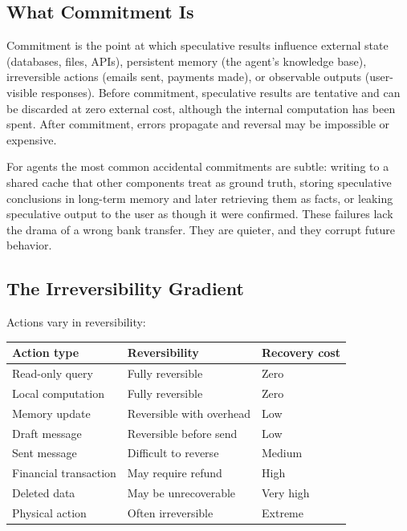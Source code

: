 \documentclass[11pt]{book}
\begin{document}
\subsection{What Commitment Is}

Commitment is the point at which speculative results influence external state (databases, files, APIs), persistent memory (the agent's knowledge base), irreversible actions (emails sent, payments made), or observable outputs (user-visible responses). Before commitment, speculative results are tentative and can be discarded at zero external cost, although the internal computation has been spent. After commitment, errors propagate and reversal may be impossible or expensive.

For agents the most common accidental commitments are subtle: writing to a shared cache that other components treat as ground truth, storing speculative conclusions in long-term memory and later retrieving them as facts, or leaking speculative output to the user as though it were confirmed. These failures lack the drama of a wrong bank transfer. They are quieter, and they corrupt future behavior.

\subsection{The Irreversibility Gradient}

Actions vary in reversibility:

\begin{center}
\begin{tabular}{lll}
\toprule
Action type & Reversibility & Recovery cost \\
\midrule
Read-only query & Fully reversible & Zero \\
Local computation & Fully reversible & Zero \\
Memory update & Reversible with overhead & Low \\
Draft message & Reversible before send & Low \\
Sent message & Difficult to reverse & Medium \\
Financial transaction & May require refund & High \\
Deleted data & May be unrecoverable & Very high \\
Physical action & Often irreversible & Extreme \\
\bottomrule
\end{tabular}
\end{center}
\end{document}
